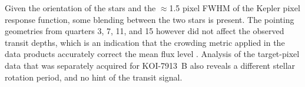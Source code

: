\documentclass[12pt,twocolumn,tighten,linenumbers]{aastex63}
\begin{document}
Given the orientation of the stars and the $\approx$1.5 pixel FWHM of
the Kepler pixel response function, some blending between the two
stars is present.  The pointing geometries from quarters 3, 7, 11, and
15 however did not affect the observed transit depths,
which is an indication that the crowding metric applied in the data
products accurately correct the mean flux level
\citep{2017ksci.rept....6M}.  Analysis of the target-pixel data that
was separately acquired for KOI-7913~B also reveals a
different stellar rotation period, and no hint of the transit signal.


\vspace{-6cm}



\clearpage
\listofchanges
\end{document}

